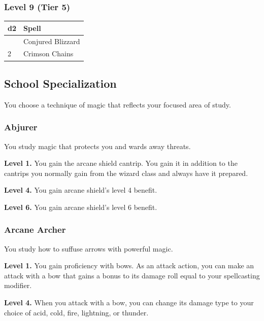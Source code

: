 \documentclass[12pt,letterpaper,twocolumn,openany,nodeprecatedcode,bg=none]{dndbook}
\begin{document}
\subsubsection{Level 9 (Tier 5)}\label{level-9-tier-5}

\begin{longtable}[]{@{}ll@{}}
\toprule\noalign{}
d2 & Spell \\
\midrule\noalign{}
\endhead
\bottomrule\noalign{}
\endlastfoot
1 & Conjured Blizzard \\
2 & Crimson Chains \\
\end{longtable}

\twocolumn

\subsection{School Specialization}\label{school-specialization}

You choose a technique of magic that reflects your focused area of
study.

\subsubsection{Abjurer}\label{abjurer}

You study magic that protects you and wards away threats.

\textbf{Level 1.} You gain the arcane shield cantrip. You gain it in
addition to the cantrips you normally gain from the wizard class and
always have it prepared.

\textbf{Level 4.} You gain arcane shield's level 4 benefit.

\textbf{Level 6.} You gain arcane shield's level 6 benefit.

\subsubsection{Arcane Archer}\label{arcane-archer}

You study how to suffuse arrows with powerful magic.

\textbf{Level 1.} You gain proficiency with bows. As an attack action,
you can make an attack with a bow that gains a bonus to its damage roll
equal to your spellcasting modifier.

\textbf{Level 4.} When you attack with a bow, you can change its damage
type to your choice of acid, cold, fire, lightning, or thunder.
\end{document}
